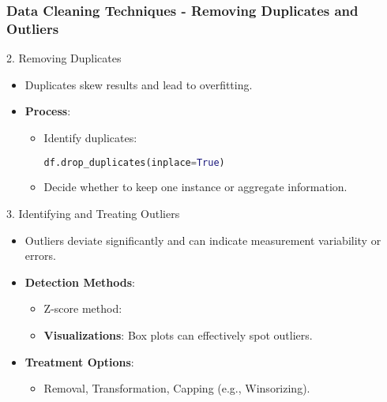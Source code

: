 \documentclass[aspectratio=169]{beamer}
\begin{document}
\begin{frame}[fragile]
    \frametitle{Data Cleaning Techniques - Removing Duplicates and Outliers}
    \begin{block}{2. Removing Duplicates}
        \begin{itemize}
            \item Duplicates skew results and lead to overfitting.
            \item \textbf{Process}:
            \begin{itemize}
                \item Identify duplicates:
                \begin{lstlisting}[language=Python]
                df.drop_duplicates(inplace=True)
                \end{lstlisting}
                \item Decide whether to keep one instance or aggregate information.
            \end{itemize}
        \end{itemize}
    \end{block}

    \begin{block}{3. Identifying and Treating Outliers}
        \begin{itemize}
            \item Outliers deviate significantly and can indicate measurement variability or errors.
            \item \textbf{Detection Methods}:
            \begin{itemize}
                \item Z-score method:
                \item \textbf{Visualizations}:
                Box plots can effectively spot outliers.
            \end{itemize}
            \item \textbf{Treatment Options}:
            \begin{itemize}
                \item Removal, Transformation, Capping (e.g., Winsorizing).
            \end{itemize}
        \end{itemize}
    \end{block}
\end{frame}
\end{document}
